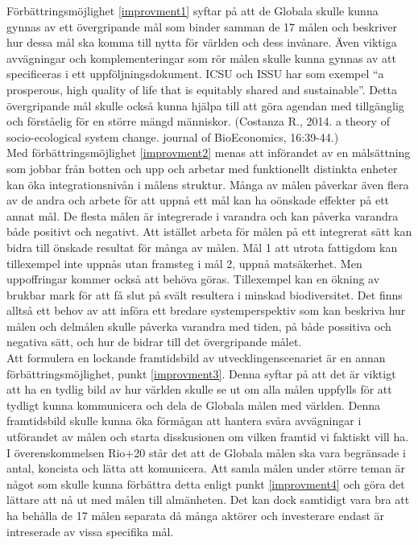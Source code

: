 \documentclass{report}
\begin{document}
Förbättringsmöjlighet \ref{improvment1} syftar på att de Globala skulle kunna gynnas av ett övergripande mål som binder samman de 17 målen och beskriver hur dessa mål ska komma till nytta för världen och dess invånare. Även viktiga avvägningar och komplementeringar som rör målen skulle kunna gynnas av att specificeras i ett uppföljningsdokument. ICSU och ISSU har som exempel “a prosperous, high quality of life that is equitably shared and sustainable”. Detta övergripande mål skulle också kunna hjälpa till att göra agendan med tillgänglig och förståelig för en större mängd människor. (Costanza R., 2014. a theory of socio-ecological system change. journal of BioEconomics, 16:39-44.)\\

Med förbättringsmöjlighet \ref{improvment2} menas att införandet av en målsättning som jobbar från botten och upp och arbetar med funktionellt distinkta enheter kan öka integrationsnivån i målens struktur.\cite{Weitz}
Många av målen påverkar även flera av de andra och arbete för att uppnå ett mål kan ha oönskade effekter på ett annat mål. De flesta målen är integrerade i varandra och kan påverka varandra både positivt och negativt. Att istället arbeta för målen på ett integrerat sätt kan bidra till önskade resultat för många av målen. Mål 1 att utrota fattigdom kan tillexempel inte uppnås utan framsteg i mål 2, uppnå matsäkerhet. Men uppoffringar kommer också att behöva göras. Tillexempel kan en ökning av brukbar mark för att få slut på svält resultera i minskad biodiversitet. Det finns alltså ett behov av att införa ett bredare systemperspektiv som kan beskriva hur målen och delmålen skulle påverka varandra med tiden, på både possitiva och negativa sätt, och hur de bidrar till det övergripande målet. \cite{review}\\

Att formulera en lockande framtidsbild av utvecklingenscenariet är en annan förbättringsmöjlighet, punkt \ref{improvment3}. Denna syftar på att det är viktigt att ha en tydlig bild av hur världen skulle se ut om alla målen uppfylls för att tydligt kunna kommunicera och dela de Globala målen med världen. Denna framtidsbild skulle kunna öka förmågan att hantera svåra avvägningar i utförandet av målen och starta disskusionen om vilken framtid vi faktiskt vill ha.\cite{webCostanza1}\\

I överenskommelsen Rio+20 står det att de Globala målen ska vara begränsade i antal, koncista och lätta att komunicera. Att samla målen under större teman är något som skulle kunna förbättra detta enligt punkt \ref{improvment4} och göra det lättare att nå ut med målen till almänheten. Det kan dock samtidigt vara bra att ha behålla de 17 målen separata då många aktörer och investerare endast är intreserade av vissa specifika mål. \cite{review}\\
\end{document}
